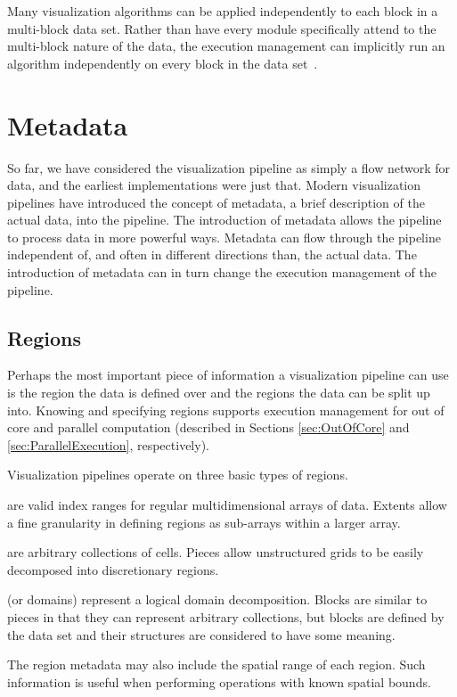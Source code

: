 \documentclass[journal,twocolumn,10pt,letterpaper,twoside]{IEEEtran}
\newcommand*{\lcite}[1]{~\cite{#1}}
\begin{document}
Many visualization algorithms can be applied independently to each block in
a multi-block data set.  Rather than have every module specifically
attend to the multi-block nature of the data, the execution management can
implicitly run an algorithm independently on every block in the data
set\lcite{VTKUsersGuide}.


\section{Metadata}
\label{sec:Metadata}

So far, we have considered the visualization pipeline as simply a flow
network for data, and the earliest implementations were just that.  Modern
visualization pipelines have introduced the concept of metadata, a brief
description of the actual data, into the pipeline.  The introduction of
metadata allows the pipeline to process data in more powerful ways.
Metadata can flow through the pipeline independent of, and often in
different directions than, the actual data.  The introduction of metadata
can in turn change the execution management of the pipeline.

\subsection{Regions}
\label{sec:Regions}

Perhaps the most important piece of information a visualization pipeline
can use is the region the data is defined over and the regions the data can
be split up into.  Knowing and specifying regions supports execution
management for out of core and parallel computation (described in Sections
\ref{sec:OutOfCore} and \ref{sec:ParallelExecution}, respectively).

Visualization pipelines operate on three basic types of regions.
\begin{description}
\item[Extents] are valid index ranges for regular multidimensional arrays
  of data.  Extents allow a fine granularity in defining regions as
  sub-arrays within a larger array.
\item[Pieces] are arbitrary collections of cells.  Pieces allow
  unstructured grids to be easily decomposed into discretionary regions.
\item[Blocks] (or domains) represent a logical domain decomposition.
  Blocks are similar to pieces in that they can represent arbitrary
  collections, but blocks are defined by the data set and their structures
  are considered to have some meaning.
\end{description}
The region metadata may also include the spatial range of each region.
Such information is useful when performing operations with known spatial
bounds.
\end{document}
